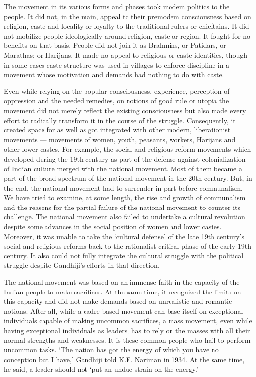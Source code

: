 \begin{multicols}{2}
The movement in its various forms and phases took modem politics to the people. It did not, in the main, appeal to their pre­modem consciousness based on religion, caste and locality or loyalty to the traditional rulers or chieftains. It did not mobilize people ideologically around religion, caste or region. It fought for no benefits on that basis. People did not join it as Brahmins, or Patidars, or Marathas; or Harijans. It made no appeal to religious or caste identities, though in some cases caste structure was used in villages to enforce discipline in a movement whose motivation and demands had nothing to do with caste.

Even while relying on the popular consciousness, experience, perception of oppression and the needed remedies, on notions of good rule or utopia the movement did not merely reflect the existing consciousness but also made every effort to radically transform it in the course of the struggle. Consequently, it created space for as well as got integrated with other modern, liberationist movements --- movements of women, youth, peasants, workers, Harijans and other lower castes. For example, the social and religious reform movements which developed during the 19th century as part of the defense against colonialization of Indian culture merged with the national movement. Most of them became a part of the broad spectrum of the national movement in the 20th century. But, in the end, the national movement had to surrender in part before communalism. We have tried to examine, at some length, the rise and growth of communalism and the reasons for the partial failure of the national movement to counter its challenge. The national movement also failed to undertake a cultural revolution despite some advances in the social position of women and lower castes. Moreover, it was unable to take the `cultural defense' of the late 19th century's social and religious reforms back to the rationalist critical phase of the early 19th century. It also could not fully integrate the cultural struggle with the political struggle despite Gandhiji's efforts in that direction.

The national movement was based on an immense faith in the capacity of the Indian people to make sacrifices. At the same time, it recognized the limits on this capacity and did not make demands based on unrealistic and romantic notions. After all, while a cadre-based movement can base itself on exceptional individuals capable of making uncommon sacrifices, a mass movement, even while having exceptional individuals as leaders, has to rely on the masses with all their normal strengths and weaknesses. It is these common people who hail to perform uncommon tasks. `The nation has got the energy of which you have no conception but I have,' Gandhiji told K.F. Nariman in 1934. At the same time, he said, a leader should not `put an undue strain on the energy.'


\end{multicols}
